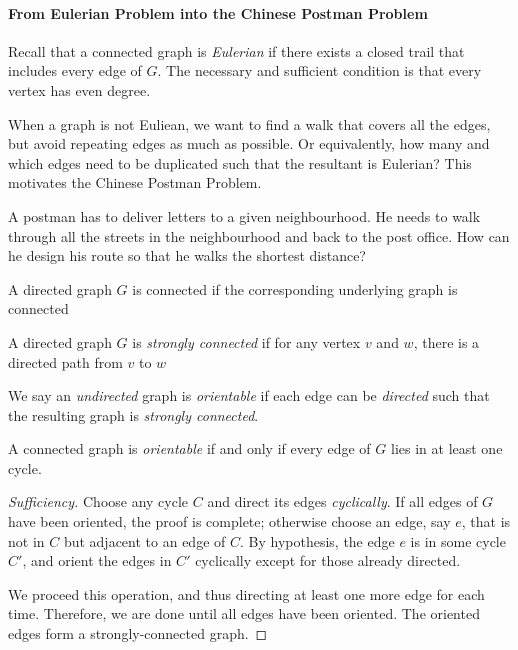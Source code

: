 \paragraph{From Eulerian Problem into the Chinese Postman Problem}
Recall that a connected graph is \emph{Eulerian} if there exists a closed trail that includes every edge of $G$. The necessary and sufficient condition is that every vertex has even degree.

When a graph is not Euliean, we want to find a walk that covers all the edges, but avoid repeating  edges as much as possible. Or equivalently, how many and which edges need to be duplicated such that the resultant is Eulerian? This motivates the Chinese Postman Problem.

\begin{definition}
A postman has to deliver letters to a given neighbourhood. He needs to walk through all the streets in the neighbourhood and back to the post office. How can he design his route so that he walks the shortest distance?
\end{definition}

\begin{definition}[Connected]
A directed graph $G$ is connected if the corresponding underlying graph is connected
\end{definition}
\begin{definition}
A directed graph $G$ is \emph{strongly connected} if for any vertex $v$ and $w$, there is a directed path from $v$ to $w$
\end{definition}
\begin{definition}[Orientable]
We say an \emph{undirected} graph is \emph{orientable} if each edge can be \emph{directed} such that the resulting graph is \emph{strongly connected}.
\end{definition}

\begin{theorem}
A connected graph is \emph{orientable} if and only if every edge of $G$ lies in at least one cycle.
\end{theorem}

\begin{proof}[Sufficiency]
Choose any cycle $C$ and direct its edges \emph{cyclically}.
If all edges of $G$ have been oriented, the proof is complete; otherwise choose an edge, say $e$, that is not in $C$ but adjacent to an edge of $C$.
By hypothesis, the edge $e$ is in some cycle $C'$, and orient the edges in $C'$ cyclically except for those already directed.

We proceed this operation, and thus directing at least one more edge for each time.
Therefore, we are done until all edges have been oriented.
The oriented edges form a strongly-connected graph.
\end{proof}



















